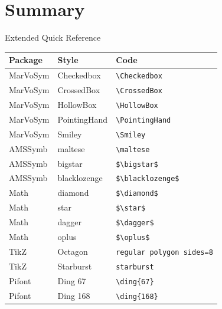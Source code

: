 \documentclass[12pt]{beamer}
\begin{document}
\section{Summary}

\begin{frame}{Extended Quick Reference}
\centering
\scriptsize
\begin{tabular}{l l l}
\toprule
\textbf{Package} & \textbf{Style} & \textbf{Code} \\
\midrule
MarVoSym & Checkedbox & \texttt{\textbackslash Checkedbox} \\
MarVoSym & CrossedBox & \texttt{\texttt{\textbackslash CrossedBox}} \\
MarVoSym & HollowBox & \texttt{\textbackslash HollowBox} \\
MarVoSym & PointingHand & \texttt{\textbackslash PointingHand} \\
MarVoSym & Smiley & \texttt{\textbackslash Smiley} \\
AMSSymb & maltese & \texttt{\textbackslash maltese} \\
AMSSymb & bigstar & \texttt{\$\textbackslash bigstar\$} \\
AMSSymb & blacklozenge & \texttt{\$\textbackslash blacklozenge\$} \\
Math & diamond & \texttt{\$\textbackslash diamond\$} \\
Math & star & \texttt{\$\textbackslash star\$} \\
Math & dagger & \texttt{\$\textbackslash dagger\$} \\
Math & oplus & \texttt{\$\textbackslash oplus\$} \\
TikZ & Octagon & \texttt{regular polygon sides=8} \\
TikZ & Starburst & \texttt{starburst} \\
Pifont & Ding 67 & \texttt{\textbackslash ding\{67\}} \\
Pifont & Ding 168 & \texttt{\textbackslash ding\{168\}} \\
\bottomrule
\end{tabular}
\end{frame}
\end{document}
